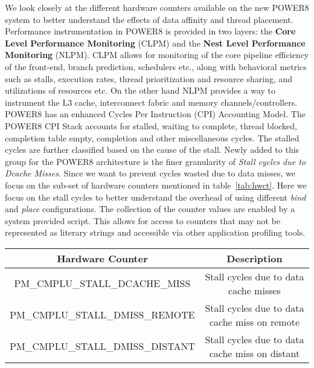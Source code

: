 We look closely at the different hardware counters available on the new POWER8 system to better understand the effects of data affinity and thread placement. Performance instrumentation in POWER8 is provided in two layers: the \textbf{Core Level Performance Monitoring} (CLPM) and the \textbf{Nest Level Performance Monitoring} (NLPM). CLPM allows for monitoring of the core pipeline efficiency of the front-end, branch prediction, schedulers etc., along with behavioral metrics such as stalls, execution rates, thread prioritization and resource sharing, and utilizations of resources etc. On the other hand NLPM provides a way to instrument the L3 cache, interconnect fabric and memory channels/controllers. POWER8 has an enhanced Cycles Per Instruction (CPI) Accounting Model. The POWER8 CPI Stack accounts for stalled, waiting to complete, thread blocked, completion table empty, completion and other miscellaneous cycles. The stalled cycles are further classified based on the cause of the stall. Newly added to this group for the POWER8 architecture is the finer granularity of \textit{ Stall cycles due to Dcache Misses}. Since we want to prevent cycles wasted due to data misses, we focus on the sub-set of hardware counters mentioned in table~\ref{tab:hwct}. Here we focus on the  stall cycles to better understand the overhead of using different \textit{bind} and \textit{place} configurations. The collection of the counter values are enabled by a system provided script. This allows for access to counters that may not be represented as literary strings and accessible via other application profiling tools. 

\begin{table*}[t]
\vspace{-0.5pc}
\caption{POWER8 Relevant Counters}
\centering
\begin{tabular} { | c | c | }
\hline
{\bf Hardware Counter} & {\bf Description}  \\ \hline
PM\_CMPLU\_STALL\_DCACHE\_MISS & Stall cycles due to data cache misses	\\	\hline
PM\_CMPLU\_STALL\_DMISS\_REMOTE & Stall cycles due to data cache miss on remote \\	\hline
PM\_CMPLU\_STALL\_DMISS\_DISTANT & Stall cycles due to data cache miss on distant \\ \hline
\end{tabular}
\label{tab:hwct}
\end{table*}
